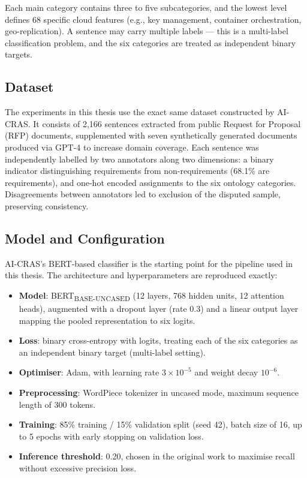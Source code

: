 Each main category contains three to five subcategories, and the lowest level defines 68 specific cloud features (e.g., key management, container orchestration, geo-replication). A sentence may carry multiple labels — this is a multi-label classification problem, and the six categories are treated as independent binary targets.

\subsection{Dataset}

The experiments in this thesis use the exact same dataset constructed by AI-CRAS. It consists of 2,166 sentences extracted from public Request for Proposal (RFP) documents, supplemented with seven synthetically generated documents produced via GPT-4 to increase domain coverage. Each sentence was independently labelled by two annotators along two dimensions: a binary indicator distinguishing requirements from non-requirements (68.1\% are requirements), and one-hot encoded assignments to the six ontology categories. Disagreements between annotators led to exclusion of the disputed sample, preserving consistency.

\subsection{Model and Configuration}

AI-CRAS's BERT-based classifier is the starting point for the pipeline used in this thesis. The architecture and hyperparameters are reproduced exactly:

\begin{itemize}
    \item \textbf{Model}: BERT\textsubscript{BASE-UNCASED} (12 layers, 768 hidden units, 12 attention heads), augmented with a dropout layer (rate 0.3) and a linear output layer mapping the pooled representation to six logits.
    \item \textbf{Loss}: binary cross-entropy with logits, treating each of the six categories as an independent binary target (multi-label setting).
    \item \textbf{Optimiser}: Adam, with learning rate $3\times10^{-5}$ and weight decay $10^{-6}$.
    \item \textbf{Preprocessing}: WordPiece tokenizer in uncased mode, maximum sequence length of 300 tokens.
    \item \textbf{Training}: 85\% training / 15\% validation split (seed 42), batch size of 16, up to 5 epochs with early stopping on validation loss.
    \item \textbf{Inference threshold}: 0.20, chosen in the original work to maximise recall without excessive precision loss.
\end{itemize}

